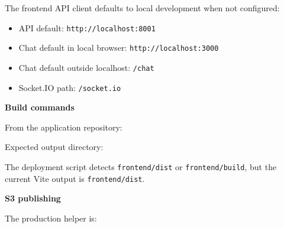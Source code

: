 The frontend API client defaults to local development when not
configured:

\begin{itemize}
\tightlist
\item
  API default: \texttt{http:/\allowbreak{}/\allowbreak{}localhost:8001}
\item
  Chat default in local browser: \texttt{http:/\allowbreak{}/\allowbreak{}localhost:3000}
\item
  Chat default outside localhost: \texttt{/\allowbreak{}chat}
\item
  Socket.IO path: \texttt{/\allowbreak{}socket.\allowbreak{}io}
\end{itemize}

\vspace{0.5em}\noindent\textbf{Build commands}\par

From the application repository:

\begin{Shaded}
\begin{Highlighting}[]
\OperatorTok{=}\OperatorTok{=} 
\end{Highlighting}
\end{Shaded}

Expected output directory:

\begin{Shaded}
\begin{Highlighting}[]
\end{Highlighting}
\end{Shaded}

The deployment script detects \texttt{frontend/\allowbreak{}dist} or
\texttt{frontend/\allowbreak{}build}, but the current Vite output is
\texttt{frontend/\allowbreak{}dist}.

\vspace{0.5em}\noindent\textbf{S3 publishing}\par

The production helper is:

\begin{Shaded}
\begin{Highlighting}[]
\end{Highlighting}
\end{Shaded}

